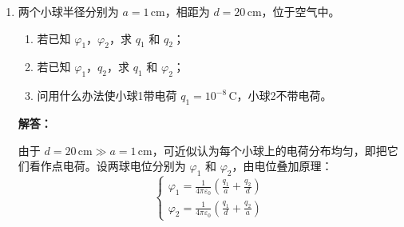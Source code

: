 \begin{enumerate}[label=\arabic*.]
\vspace{0.5em}
(2) 分区介质同心导体球壳（图b）

设左半区域（\(\varepsilon_1\)）电位为 \(\varphi_1(r)\)，右半区域（\(\varepsilon_2\)）电位为 \(\varphi_2(r)\)，根据球对称性，电位仅与 \(r\) 有关，且两区域电位相等 \(\varphi_1(r)=\varphi_2(r)=\varphi(r)\)。

控制方程（\(a<r<b\)）：
\[
\nabla^2 \varphi = 0
\]

边界条件：
\begin{align*}
& r=a: & & -\left( \varepsilon_1 \int_{\text{左半球}} \frac{\partial \varphi}{\partial r} dS + \varepsilon_2 \int_{\text{右半球}} \frac{\partial \varphi}{\partial r} dS \right) = Q \\
& r=b: & & \varphi = 0 \\
& \theta=\pi/2: & & \varphi_1 = \varphi_2,\quad \varepsilon_1 \frac{\partial \varphi_1}{\partial \theta} = \varepsilon_2 \frac{\partial \varphi_2}{\partial \theta}
\end{align*}

\vspace{0.5em}
(3) 无限长同轴圆柱导体（图c）

设电位分布为 \(\varphi(\rho)\)，根据轴对称性，电位仅与径向坐标 \(\rho\) 有关，区域 \(a<\rho<b\) 内：

控制方程：
\[
\nabla^2 \varphi = 0
\]

边界条件：
\begin{align*}
& \rho=a: & & -2\pi a \varepsilon_0 \frac{d\varphi}{d\rho}\bigg|_{\rho=a} = \tau \\
& \rho=b: & & \varphi = 0
\end{align*}

\vspace{1em}

\item 两个小球半径分别为 \(a=1\,\text{cm}\)，相距为 \(d=20\,\text{cm}\)，位于空气中。
\begin{enumerate}
    \item 若已知 \(\varphi_1\)，\(\varphi_2\)，求 \(q_1\) 和 \(q_2\)；
    \item 若已知 \(\varphi_1\)，\(q_2\)，求 \(q_1\) 和 \(\varphi_2\)；
    \item 问用什么办法使小球1带电荷 \(q_1 = 10^{-8}\,\text{C}\)，小球2不带电荷。
\end{enumerate}

\textbf{解答：}

由于 \(d=20\,\text{cm} \gg a=1\,\text{cm}\)，可近似认为每个小球上的电荷分布均匀，即把它们看作点电荷。设两球电位分别为 \(\varphi_1\) 和 \(\varphi_2\)，由电位叠加原理：
\[
\begin{cases}
\varphi_1 = \frac{1}{4\pi\varepsilon_0} \left( \frac{q_1}{a} + \frac{q_2}{d} \right) \\
\varphi_2 = \frac{1}{4\pi\varepsilon_0} \left( \frac{q_1}{d} + \frac{q_2}{a} \right)
\end{cases}
\]


\end{enumerate}
